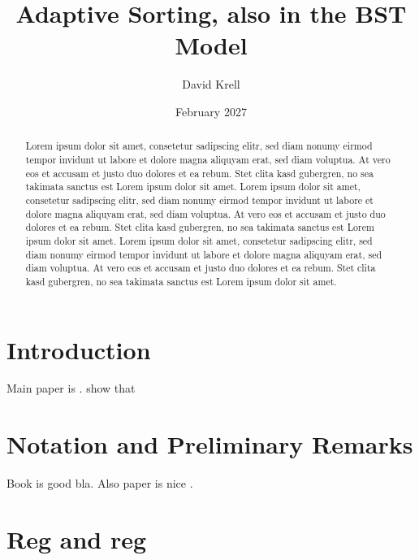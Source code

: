\documentclass[american, abstract=on]{scrartcl}
\title{Adaptive Sorting, also in the BST Model}
\author{David Krell}
\date{\small February 2027}
\begin{document}
	\maketitle

	\begin{abstract}
	
		Lorem ipsum dolor sit amet, consetetur sadipscing elitr, sed diam nonumy eirmod tempor invidunt
		ut labore et dolore magna aliquyam erat, sed diam voluptua. At vero eos et accusam et justo duo
		dolores et ea rebum. Stet clita kasd gubergren, no sea takimata sanctus est Lorem ipsum dolor sit
		amet. Lorem ipsum dolor sit amet, consetetur sadipscing elitr, sed diam nonumy eirmod tempor 
		invidunt ut labore et dolore magna aliquyam erat, sed diam voluptua. At vero eos et accusam et
		justo duo dolores et ea rebum. Stet clita kasd gubergren, no sea takimata sanctus est Lorem ipsum
		dolor sit amet. Lorem ipsum dolor sit amet, consetetur sadipscing elitr, sed diam nonumy eirmod 
		tempor invidunt ut labore et dolore magna aliquyam erat, sed diam voluptua. At vero eos et accusam
		et justo duo dolores et ea rebum. Stet clita kasd gubergren, no sea takimata sanctus est Lorem 
		ipsum dolor sit amet.  
		
	\end{abstract}

	\section{Introduction}
	
		Main paper is \cite{mainpaper}. \textcite{mainpaper} show that

	\newpage

	\section{Notation and Preliminary Remarks}
	
		Book \cite{knudsen2011block} is good \textcite{knudsen2011block} bla.
		Also paper \cite{dansarie2022breaking} is nice \textcite{dansarie2022breaking}.
		
	\section{Reg and reg}
	
	\newpage
	
	\printbibliography
\end{document}
